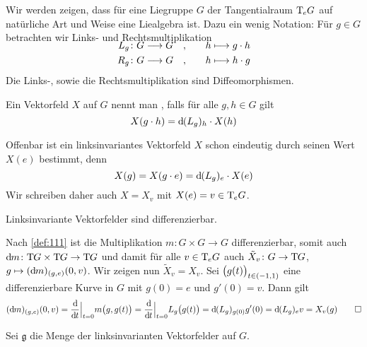 Wir werden zeigen, dass für eine Liegruppe $G$ der Tangentialraum $\Tmap_e G$ auf natürliche Art und Weise eine Liealgebra ist.
Dazu ein wenig Notation: Für $g \in G$ betrachten wir Links- und Rechtsmultiplikation
\begin{align}
	\SwapAboveDisplaySkip
	L_g \colon G \longrightarrow G \quad , \qquad &h \longmapsto g \cdot h \\
	R_g \colon G \longrightarrow G \quad , \qquad &h \longmapsto h \cdot g
\end{align}
Die Links-, sowie die Rechtsmultiplikation sind Diffeomorphismen. 

\begin{definition}[{name=[linksinvariantes Vektorfeld]}]
	Ein Vektorfeld $X$ auf $G$ nennt man , falls für alle $g,h \in G$ gilt
	\[
		X(g \cdot h) = \mathd(L_g)_h \cdot X(h)
	\]
\end{definition}

Offenbar ist ein linksinvariantes Vektorfeld $X$ schon eindeutig durch seinen Wert $X(e)$ bestimmt, denn 
\[
	X(g) = X(g \cdot e) = \mathd(L_g)_e \cdot X(e)
\]
Wir schreiben daher auch $X=X_v$ mit $X(e)=v \in \Tmap_e G$.

\begin{lemma}[label=lem:114,{name=[Linksinvariante Vektorfelder sind differenzierbar]}]
	Linksinvariante Vektorfelder sind differenzierbar.
\end{lemma}
\begin{beweis}
	Nach \autoref{def:111} ist die Multiplikation $m \colon G \times G \to G$ differenzierbar, somit auch $\mathd m \colon \Tmap G \times \Tmap G \to\Tmap G$ und damit für alle $v \in \Tmap_e G$ auch $\tilde{X}_v \colon G \to \Tmap G$, $g \mapsto (\mathd m)_{(g,e)}(0,v)$.
	Wir zeigen nun $\tilde{X}_v=X_v$.
	Sei $\enbrace[\big]{g(t)}_{t \in (-1,1)}$ eine differenzierbare Kurve in $G$ mit $g(0)=e$ und $g'(0)=v$.
	Dann gilt 
	\[
		(\mathd m)_{(g,e)}(0,v) = \diffd{}{t}\Big|_{t=0} m \enbrace[\big]{g,g(t)} = \diffd{}{t}\Big|_{t=0} L_g\enbrace[\big]{g(t)} = \mathd(L_g)_{g(0)} g'(0)
		 =\mathd(L_g)_e v = X_v(g) \qedhere
	\]
\end{beweis}

Sei $\mathfrak{g}$ die Menge der linksinvarianten Vektorfelder auf $G$.

